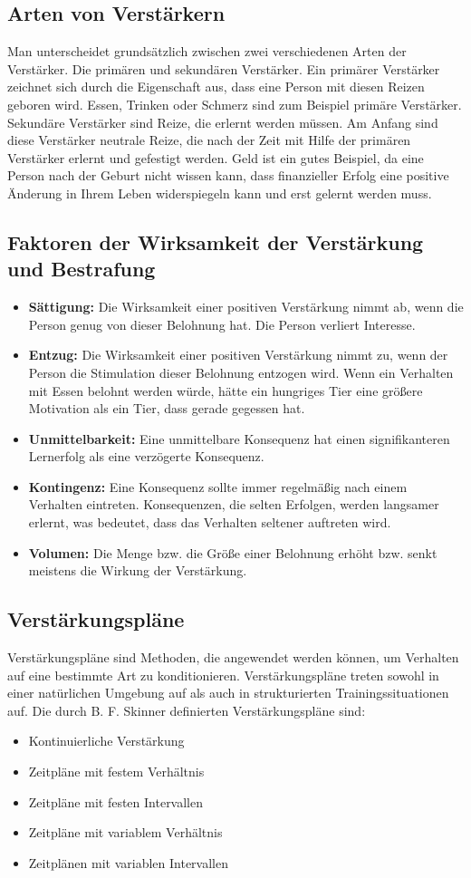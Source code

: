 \subsection{Arten von Verstärkern}
Man unterscheidet grundsätzlich zwischen zwei verschiedenen Arten der Verstärker. Die primären und sekundären Verstärker. 
Ein primärer Verstärker zeichnet sich durch die Eigenschaft aus, dass eine Person mit diesen Reizen geboren wird. Essen, Trinken oder Schmerz sind zum Beispiel primäre Verstärker. 
Sekundäre Verstärker sind Reize, die erlernt werden müssen. Am Anfang sind diese Verstärker neutrale Reize, die nach der Zeit mit Hilfe der primären Verstärker erlernt und gefestigt werden. Geld ist ein gutes Beispiel, da eine Person nach der Geburt nicht wissen kann, dass finanzieller Erfolg eine positive Änderung in Ihrem Leben widerspiegeln kann und erst gelernt werden muss. 
\subsection{Faktoren der Wirksamkeit der Verstärkung und Bestrafung}	
\begin{itemize}
	\item \textbf{Sättigung:} Die Wirksamkeit einer positiven Verstärkung nimmt ab, wenn die Person genug von dieser Belohnung hat. Die Person verliert Interesse.
	\item \textbf{Entzug:} Die Wirksamkeit einer positiven Verstärkung nimmt zu, wenn der Person die Stimulation dieser Belohnung entzogen wird. Wenn ein Verhalten mit Essen belohnt werden würde, hätte ein hungriges Tier eine größere Motivation als ein Tier, dass gerade gegessen hat. 
	\item \textbf{Unmittelbarkeit:} Eine unmittelbare Konsequenz hat einen signifikanteren Lernerfolg als eine verzögerte Konsequenz. 
	\item \textbf{Kontingenz:} Eine Konsequenz sollte immer regelmäßig nach einem Verhalten eintreten. Konsequenzen, die selten Erfolgen, werden langsamer erlernt, was bedeutet, dass das Verhalten seltener auftreten wird. 
	\item \textbf{Volumen:} Die Menge bzw. die Größe einer Belohnung erhöht bzw. senkt meistens die Wirkung der Verstärkung. 
\end{itemize}
\subsection{Verstärkungspläne}
Verstärkungspläne sind Methoden, die angewendet werden können, um Verhalten auf eine bestimmte Art zu konditionieren. 
Verstärkungspläne treten sowohl in einer natürlichen Umgebung auf als auch in strukturierten Trainingssituationen auf. 
Die durch B. F. Skinner definierten Verstärkungspläne sind: 
\begin{itemize}
	\item Kontinuierliche Verstärkung
	\item Zeitpläne mit festem Verhältnis
	\item Zeitpläne mit festen Intervallen
	\item Zeitpläne mit variablem Verhältnis
	\item Zeitplänen mit variablen Intervallen
\end{itemize}
